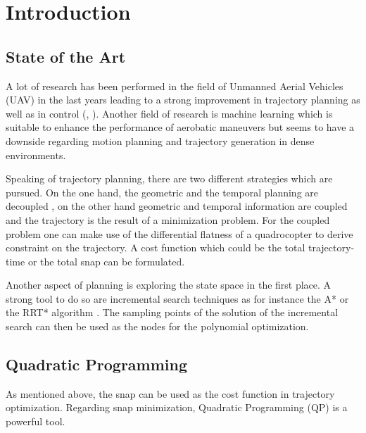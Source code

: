
\chapter{Introduction}\label{sec:introduction}

\section{State of the Art}\label{sec:state}

A lot of research has been performed in the field of Unmanned Aerial Vehicles (UAV) in the last years leading to a strong improvement in trajectory planning \cite{he} as well as in control (\cite{colling}, \cite{hehn}).  Another field of research is machine learning \cite{lup} which is suitable to enhance the performance of aerobatic maneuvers but seems to have a downside regarding motion planning and trajectory generation in dense environments. \newline

Speaking of trajectory planning, there are two different strategies which are pursued. On the one hand, the geometric and the temporal planning are decoupled  \cite{bou}, on the other hand geometric and temporal information are coupled and the trajectory is the result of a minimization problem. For the coupled problem one can make use of the differential flatness of a quadrocopter to derive constraint on the trajectory. A cost function which could be the total trajectory-time \cite{hehn} or the total snap \cite{mellinger} can be formulated. \newline



Another aspect of planning is exploring the state space in the first place. A strong tool to do so are incremental search techniques as for instance the A* \cite{lik} or the RRT* algorithm \cite{richter}. The sampling points of the solution of the incremental search can then be used as the nodes for the polynomial optimization.

\section{Quadratic Programming}\label{sec:quadratic}

As mentioned above, the snap can be used as the cost function in trajectory optimization. Regarding snap minimization, Quadratic Programming (QP) is a powerful tool.

